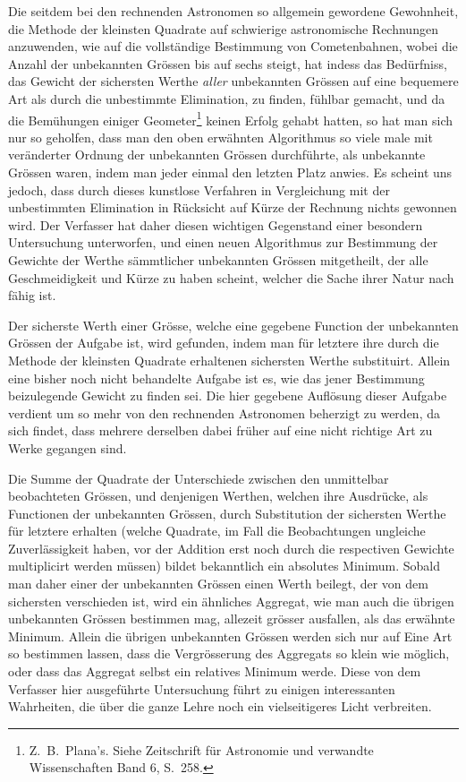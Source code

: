 \documentclass[12pt,a4paper]{article}
\begin{document}
Die seitdem bei den rechnenden Astronomen so allgemein gewordene Gewohnheit, die Methode der kleinsten Quadrate auf schwierige astronomische Rechnungen anzuwenden, wie auf die vollst\"andige Bestimmung von Cometenbahnen, wobei die Anzahl der unbekannten Gr\"ossen bis auf sechs steigt, hat indess das Bed\"urfniss, das Gewicht der sichersten Werthe \textit{aller} unbekannten Gr\"ossen auf eine bequemere Art als durch die unbestimmte Elimination, zu finden, f\"uhlbar gemacht, und da die Bem\"uhungen einiger Geometer\footnote{Z.\ B.\ Plana's. Siehe Zeitschrift f\"ur Astronomie und verwandte Wissenschaften Band 6, S.\ 258.} keinen Erfolg gehabt hatten, so hat man sich nur so geholfen, dass man den oben erw\"ahnten Algorithmus so viele male mit ver\"anderter Ordnung der unbekannten Gr\"ossen durchf\"uhrte, als unbekannte Gr\"ossen waren, indem man jeder einmal den letzten Platz anwies. Es scheint uns jedoch, dass durch dieses kunstlose Verfahren in Vergleichung mit der unbestimmten Elimination in R\"ucksicht auf K\"urze der Rechnung nichts gewonnen wird. Der Verfasser hat daher diesen wichtigen Gegenstand einer besondern Untersuchung unterworfen, und einen neuen Algorithmus zur Bestimmung der Gewichte der Werthe s\"ammtlicher unbekannten Gr\"ossen mitgetheilt, der alle Geschmeidigkeit und K\"urze zu haben scheint, welcher die Sache ihrer Natur nach f\"ahig ist.

Der sicherste Werth einer Gr\"osse, welche eine gegebene Function der unbekannten Gr\"ossen der Aufgabe ist, wird gefunden, indem man f\"ur letztere ihre durch die Methode der kleinsten Quadrate erhaltenen sichersten Werthe substituirt. Allein eine bisher noch nicht behandelte Aufgabe ist es, wie das jener Bestimmung beizulegende Gewicht zu finden sei. Die hier gegebene Aufl\"osung dieser Aufgabe verdient um so mehr von den rechnenden Astronomen beherzigt zu werden, da sich findet, dass mehrere derselben dabei fr\"uher auf eine nicht richtige Art zu Werke gegangen sind.

Die Summe der Quadrate der Unterschiede zwischen den unmittelbar beobachteten Gr\"ossen, und denjenigen Werthen, welchen ihre Ausdr\"ucke, als Functionen der unbekannten Gr\"ossen, durch Substitution der sichersten Werthe f\"ur letztere erhalten (welche Quadrate, im Fall die Beobachtungen ungleiche Zuverl\"assigkeit haben, vor der Addition erst noch durch die respectiven Gewichte multiplicirt werden m\"ussen) bildet bekanntlich ein absolutes Minimum. Sobald man daher einer der unbekannten Gr\"ossen einen Werth beilegt, der von dem sichersten verschieden ist, wird ein \"ahnliches Aggregat, wie man auch die \"ubrigen unbekannten Gr\"ossen bestimmen mag, allezeit gr\"osser ausfallen, als das erw\"ahnte Minimum. Allein die \"ubrigen unbekannten Gr\"ossen werden sich nur auf Eine Art so bestimmen lassen, dass die Vergr\"osserung des Aggregats so klein wie m\"oglich, oder dass das Aggregat selbst ein relatives Minimum werde. Diese von dem Verfasser hier ausgef\"uhrte Untersuchung f\"uhrt zu einigen interessanten Wahrheiten, die \"uber die ganze Lehre noch ein vielseitigeres Licht verbreiten.
\end{document}

